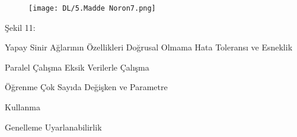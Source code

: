 \documentclass{beamer}                                                                                          %
\begin{document}

	\begin{frame}
	    \begin{figure}
	        \centering
	        \texttt{[image: DL/5.Madde Noron7.png]}
	    \end{figure}
	    \centering
	    \color{myred1}Şekil 11:\color{black}
    \end{frame}
    

	\begin{frame}{Yapay Sinir Ağlarının Özellikleri }
	        \color{myred1} \color{black} Doğrusal Olmama \hspace{65} \color{myred1} \color{black} Hata Toleransı ve Esneklik \par \vspace{25}
		    \color{myred1} \color{black} Paralel Çalışma \hspace{77} \color{myred1} \color{black} Eksik Verilerle Çalışma \par \vspace{25}
		    \color{myred1} \color{black} Öğrenme \hspace{105} \color{myred1} \color{black} Çok Sayıda Değişken ve Parametre\par \vspace{2} \hspace{180}Kullanma \par \vspace{15}
		    \color{myred1} \color{black} Genelleme \hspace{100} \color{myred1} \color{black} Uyarlanabilirlik \par
    \end{frame}
    
   
\end{document}
